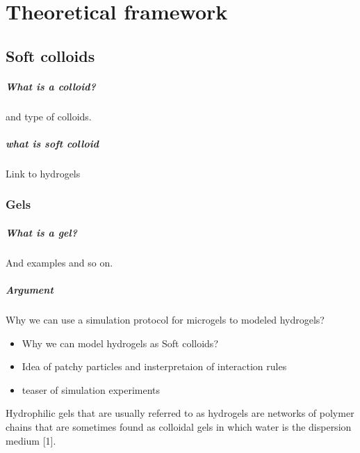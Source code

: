 \chapter{Theoretical framework}\label{ch2:Theoframework}


\section{Soft colloids}\label{ch2:SoftColloids}

\paragraph{What is a colloid?} and type of colloids.

\paragraph{what is soft colloid} Link to hydrogels

\subsection{Gels}

\paragraph{What is a gel?} And examples and so on.

\paragraph{Argument} Why we can use a simulation protocol for microgels to modeled hydrogels?


\begin{itemize}
    \item Why we can model hydrogels as Soft colloids?
    \item Idea of patchy particles and insterpretaion of interaction rules
    \item teaser of simulation experiments
\end{itemize}


Hydrophilic gels that are usually referred to as hydrogels are networks of polymer chains that are sometimes found as colloidal gels in which water is the dispersion medium [1]\citep{ahmedHydrogelPreparationCharacterization2015a}.


